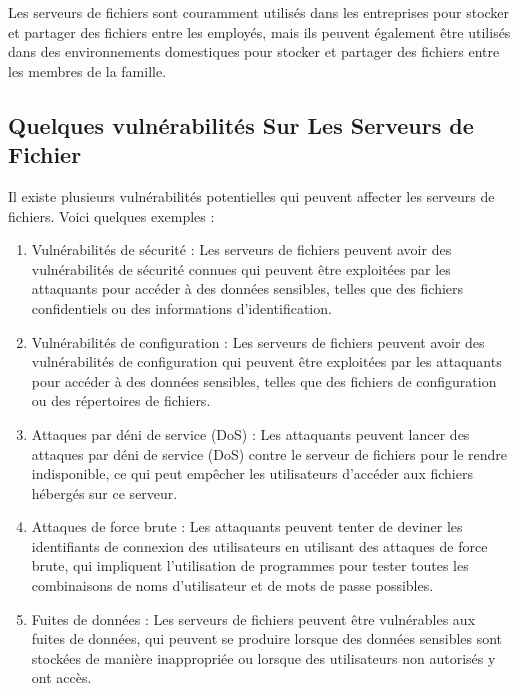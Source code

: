 Les serveurs de fichiers sont couramment utilisés dans les entreprises pour stocker et partager des fichiers entre les employés, mais ils peuvent également être utilisés dans des environnements domestiques pour stocker et partager des fichiers entre les membres de la famille.
\subsection{Quelques vulnérabilités Sur Les Serveurs de Fichier}
Il existe plusieurs vulnérabilités potentielles qui peuvent affecter les serveurs de fichiers. Voici quelques exemples :

\begin{enumerate}
\item   Vulnérabilités de sécurité : Les serveurs de fichiers peuvent avoir des vulnérabilités de sécurité connues qui peuvent être exploitées par les attaquants pour accéder à des données sensibles, telles que des fichiers confidentiels ou des informations d'identification.
 
 \item   Vulnérabilités de configuration : Les serveurs de fichiers peuvent avoir des vulnérabilités de configuration qui peuvent être exploitées par les attaquants pour accéder à des données sensibles, telles que des fichiers de configuration ou des répertoires de fichiers.
 
 \item   Attaques par déni de service (DoS) : Les attaquants peuvent lancer des attaques par déni de service (DoS) contre le serveur de fichiers pour le rendre indisponible, ce qui peut empêcher les utilisateurs d'accéder aux fichiers hébergés sur ce serveur.
 
  \item  Attaques de force brute : Les attaquants peuvent tenter de deviner les identifiants de connexion des utilisateurs en utilisant des attaques de force brute, qui impliquent l'utilisation de programmes pour tester toutes les combinaisons de noms d'utilisateur et de mots de passe possibles.
 
 \item   Fuites de données : Les serveurs de fichiers peuvent être vulnérables aux fuites de données, qui peuvent se produire lorsque des données sensibles sont stockées de manière inappropriée ou lorsque des utilisateurs non autorisés y ont accès.
\end{enumerate}

 
\paragraph{ }
 
